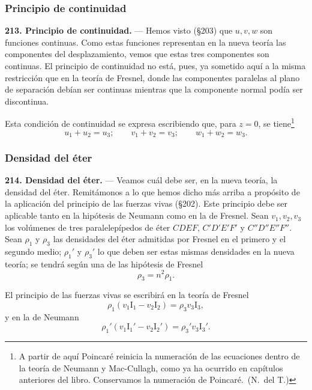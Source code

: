 \subsubsection{Principio de continuidad}

\noindent\textbf{213. Principio de continuidad.} — Hemos visto (§203) que
$u,v,w$ son funciones continuas. Como estas funciones representan en la
nueva teoría las componentes del desplazamiento, vemos que estas tres
componentes son continuas. El principio de continuidad no está, pues, ya
sometido aquí a la misma restricción que en la teoría de Fresnel, donde
las componentes paralelas al plano de separación debían ser continuas
mientras que la componente normal podía ser discontinua.

Esta condición de continuidad se expresa escribiendo que, para $z=0$, se
tiene\footnote{A partir de aquí Poincaré reinicia la numeración de las
ecuaciones dentro de la teoría de Neumann y Mac-Cullagh, como ya ha
ocurrido en capítulos anteriores del libro. Conservamos la numeración
de Poincaré.~(N.~del T.)}
\setcounter{equation}{0}
\begin{equation}
u_1+u_2=u_3;\qquad v_1+v_2=v_3;\qquad w_1+w_2=w_3.
\end{equation}

\subsubsection{Densidad del éter}

\noindent\textbf{214. Densidad del éter.} — Veamos cuál debe ser, en la
nueva teoría, la densidad del éter. Remitámonos a lo que hemos dicho más
arriba a propósito de la aplicación del principio de las fuerzas vivas
(§202). Este principio debe ser aplicable tanto en la hipótesis de
Neumann como en la de Fresnel. Sean $v_1,v_2,v_3$ los volúmenes de tres
paralelepípedos de éter $CDEF$, $C'D'E'F'$ y $C''D''E''F''$. Sean
$\rho_1$ y $\rho_3$ las densidades del éter admitidas por Fresnel en el
primero y el segundo medio; $\rho_1'$ y $\rho_3'$ lo que deben ser estas
mismas densidades en la nueva teoría; se tendrá según una de las
hipótesis de Fresnel
\[
\rho_3=n^2\rho_1.
\]

El principio de las fuerzas vivas se escribirá en la teoría de Fresnel
\begin{equation}
\rho_1(v_1\mathrm{I}_1-v_2\mathrm{I}_2)=\rho_3v_3\mathrm{I}_3,
\end{equation}
y en la de Neumann
\begin{equation}
\rho_1'(v_1\mathrm{I}_1'-v_2\mathrm{I}_2')=\rho_3'v_3\mathrm{I}_3'.
\end{equation}

